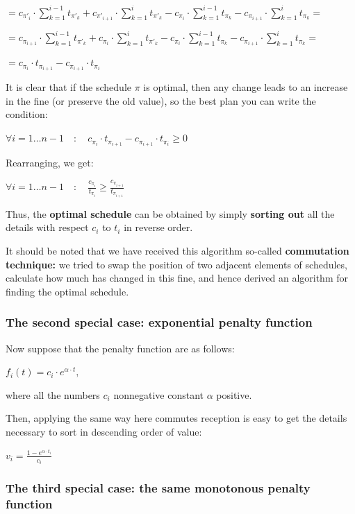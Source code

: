$=c_{\pi'_{i}}\cdot\sum_{k=1}^{i-1}t_{\pi'_{k}}+c_{\pi'_{i+1}}\cdot\sum_{k=1}^{i}t_{\pi'_{k}}-c_{\pi{}_{i}}\cdot\sum_{k=1}^{i-1}t_{\pi{}_{k}}-c_{\pi{}_{i+1}}\cdot\sum_{k=1}^{i}t_{\pi{}_{k}}=$

$=c_{\pi{}_{i+1}}\cdot\sum_{k=1}^{i-1}t_{\pi'_{k}}+c_{\pi{}_{i}}\cdot\sum_{k=1}^{i}t_{\pi'_{k}}-c_{\pi{}_{i}}\cdot\sum_{k=1}^{i-1}t_{\pi{}_{k}}-c_{\pi{}_{i+1}}\cdot\sum_{k=1}^{i}t_{\pi{}_{k}}=$

$=c_{\pi_{i}}\cdot t_{\pi_{i+1}}-c_{\pi_{i+1}}\cdot t_{\pi_{i}}$

It is clear that if the schedule $\pi$ is optimal, then any change leads to an increase in the fine (or preserve the old value), so the best plan you can write the condition:

$\forall i=1\ldots n-1\quad:\quad c_{\pi_{i}}\cdot t_{\pi_{i+1}}-c_{\pi_{i+1}}\cdot t_{\pi_{i}}\ge0$

Rearranging, we get:

$\forall i=1\ldots n-1\quad:\quad\frac{c_{\pi_{i}}}{t_{\pi_{i}}}\ge\frac{c_{\pi_{i+1}}}{t_{\pi_{i+1}}}$

Thus, the \textbf{optimal schedule} can be obtained by simply \textbf{sorting out} all the details with respect $c_i$ to $t_i$ in reverse order.

It should be noted that we have received this algorithm so-called \textbf{commutation technique:} we tried to swap the position of two adjacent elements of schedules, calculate how much has changed in this fine, and hence derived an algorithm for finding the optimal schedule.

\subsubsection{ The second special case: exponential penalty function }

Now suppose that the penalty function are as follows:

$f_i (t) = c_i \cdot e ^ {\alpha \cdot t},$

where all the numbers $c_i$ nonnegative constant $\alpha$ positive.

Then, applying the same way here commutes reception is easy to get the details necessary to sort in descending order of value:

$v_{i}=\frac{1-e^{\alpha\cdot t_{i}}}{c_{i}}$

\subsubsection{ The third special case: the same monotonous penalty function }

